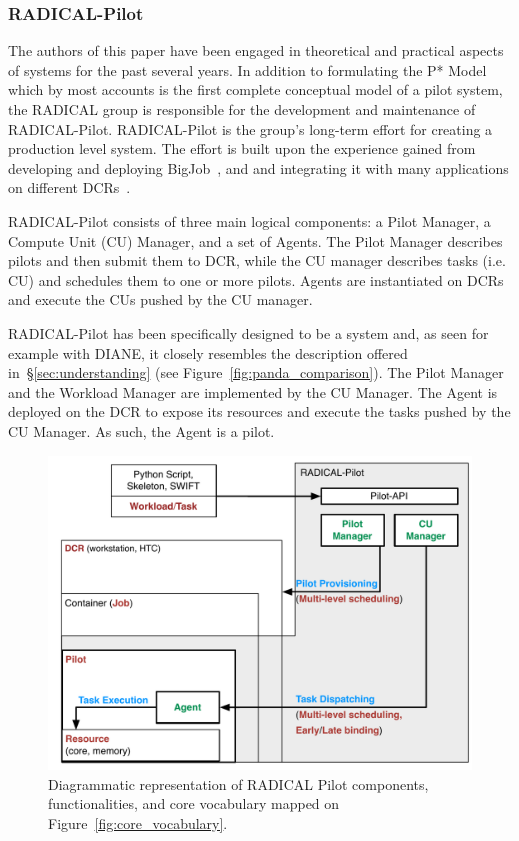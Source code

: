 \documentclass{sig-alternate}
\begin{document}
%
\subsubsection{RADICAL-Pilot}
\label{sec:radical_pilot}

The authors of this paper have been engaged in theoretical and practical aspects
of \pilot systems for the past several years. In addition to formulating the P*
Model~\cite{luckow2012} which by most accounts is the first complete conceptual
model of a pilot system, the RADICAL group is responsible for the development
and maintenance of RADICAL-Pilot\cite{merzky2015radical,rp_url}. RADICAL-Pilot
is the group's long-term effort for creating a production level \pilot system.
The effort is built upon the experience gained from developing and deploying
BigJob~\cite{luckow2010}, and and integrating it with many applications on
different DCRs~\cite{x,y,z}.

RADICAL-Pilot consists of three main logical components: a Pilot Manager, a
Compute Unit (CU) Manager, and a set of Agents. The Pilot Manager describes
pilots and then submit them to DCR, while the CU manager describes tasks (i.e.
CU) and schedules them to one or more pilots. Agents are instantiated on DCRs
and execute the CUs pushed by the CU manager.

RADICAL-Pilot has been specifically designed to be a \pilot system and, as seen
for example with DIANE, it closely resembles the description offered
in~\S\ref{sec:understanding} (see Figure~\ref{fig:panda_comparison}). The Pilot
Manager and the Workload Manager are implemented by the CU Manager. The Agent is
deployed on the DCR to expose its resources and execute the tasks pushed by the
CU Manager. As such, the Agent is a pilot.

\begin{figure}[t]
    \centering
        \includegraphics[width=.48\textwidth]{figures/radicalp_comparison.pdf}
    \caption{Diagrammatic representation of RADICAL Pilot components,
    functionalities, and core vocabulary mapped on
    Figure~\ref{fig:core_vocabulary}.}
    \label{fig:rp_comparison}
\end{figure}
\end{document}

